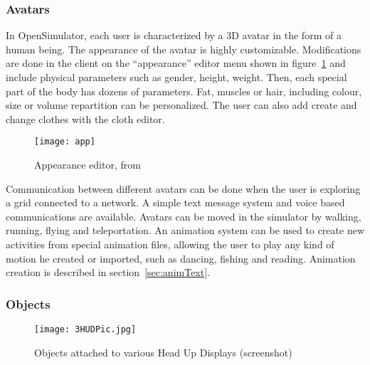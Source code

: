 
\subsubsection{Avatars}
In OpenSimulator, each user is characterized by a 3D avatar in the form of a human being. The appearance of the avatar is highly customizable. Modifications are done in the client on the ``appearance'' editor menu shown in figure~\ref{fig:app} and include physical parameters such as gender, height, weight. Then, each special part of the body has dozens of parameters. Fat, muscles or hair, including colour, size or volume repartition can be personalized. The user can also add create and change clothes with the cloth editor.

\begin{figure}[h]
  \caption{Appearance editor, from ~\cite{SLAvatar}}
  \centering
  \texttt{[image: app]}
  \label{fig:app}
\end{figure}
Communication between different avatars can be done when the user is exploring a grid connected to a network. A simple text message system and voice based communications are available. 
Avatars can be moved in the simulator by walking, running, flying and teleportation. An animation system can be used to create new activities from special animation files, allowing the user to play any kind of motion he created or imported, such as dancing, fishing and reading. Animation creation is described in section~\ref{sec:animText}.

\subsubsection{Objects} 

\begin{figure}[h]
  \caption{Objects attached to various Head Up Displays (screenshot)}
  \centering
  \texttt{[image: 3HUDPic.jpg]}
  \label{fig:3HUDPic}
\end{figure}

